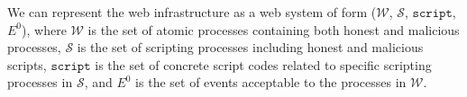 \begin{comment}
\begin{definition}
\noindent\textbf{Equivalence of HTTP requests}. There are messages $m_1$ and $m_2$, we say that $m_1$ $\approx$ $m_2$ \textbf{iff} the following conditions are met,
\vspace{-\topsep}
\begin{itemize}
\setlength{\itemsep}{0pt plus 1pt}
\item If $m_1$ and $m_2$ are HTTPs requests, they are  equivalent to the observers besides of the receiver.
\item If  $m_1$ and $m_2$ are HTTPs requests, they are equivalent for the receiver \textbf{iff} the value of the Host,Path,Origin and Referer headers in both requests are same, as well as the value of the Parameters and Body are statically equivalent.
\item If  $m_1$ and $m_2$ are HTTP requests, they are equivalent to all the observers as the equivalent HTTPS requests to receivers.
\end{itemize}
\setlength{\itemsep}{0pt plus 1pt}
\label{def:httpequ}
\end{definition}
\begin{definition}
\noindent\textbf{Equivalence of events}.
There are events $e_1$ := $\langle a_1, f_1, m_1 \rangle$ and $e_2$ := $\langle a_2, f_2, m_2 \rangle$, we say that $e_1$ $\approx$ $e_2$ \textbf{iff}
\vspace{-\topsep}
\begin{itemize}
\item $a_1$ $\equiv$ $a_2$ or $a_1$ and $a_2$ belong to random addresses.
\item $f_1$ $\equiv$ $f_2$ or $f_1$ and $f_2$ belong to random addresses.
\item $m_1$ and $m_2$ are equivalent.
\end{itemize}
\label{def:eventequ}
\end{definition}
\vspace{-\topsep}
\end{comment}

 We can represent the web infrastructure as a web system of form ($\mathcal{W}$, $\mathcal{S}$, $\mathtt{script}$, $E^0$), where $\mathcal{W}$ is the set of atomic processes containing both honest and malicious processes, $\mathcal{S}$ is the set of scripting processes including honest and malicious scripts, $\mathtt{script}$ is the set of concrete script codes related to specific scripting processes in $\mathcal{S}$, and $E^0$ is the set of events acceptable to the processes in $\mathcal{W}$.

